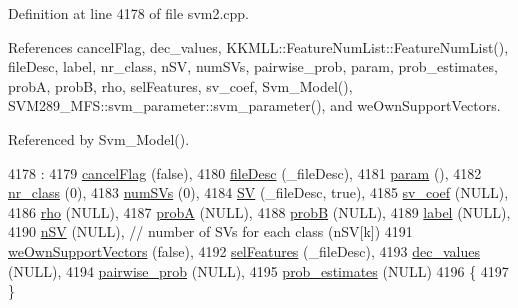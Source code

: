 Definition at line 4178 of file svm2.\+cpp.



References cancel\+Flag, dec\+\_\+values, K\+K\+M\+L\+L\+::\+Feature\+Num\+List\+::\+Feature\+Num\+List(), file\+Desc, label, nr\+\_\+class, n\+SV, num\+S\+Vs, pairwise\+\_\+prob, param, prob\+\_\+estimates, probA, probB, rho, sel\+Features, sv\+\_\+coef, Svm\+\_\+\+Model(), S\+V\+M289\+\_\+\+M\+F\+S\+::svm\+\_\+parameter\+::svm\+\_\+parameter(), and we\+Own\+Support\+Vectors.



Referenced by Svm\+\_\+\+Model().


\begin{DoxyCode}
4178                                                     :
4179    \hyperlink{struct_s_v_m289___m_f_s_1_1_svm___model_a01645368f6800875543d69ce8731d692}{cancelFlag}          (\textcolor{keyword}{false}),
4180    \hyperlink{struct_s_v_m289___m_f_s_1_1_svm___model_a60df40219f6193cae58891193aa1f44d}{fileDesc}            (\_fileDesc),
4181    \hyperlink{struct_s_v_m289___m_f_s_1_1_svm___model_af44a309facec24212604b219dc411582}{param}               (),
4182    \hyperlink{struct_s_v_m289___m_f_s_1_1_svm___model_a0cf11115996187369bc6152f30f6e64c}{nr\_class}            (0),
4183    \hyperlink{struct_s_v_m289___m_f_s_1_1_svm___model_a9d1cb317006096158440daf45c809f0c}{numSVs}              (0),
4184    \hyperlink{struct_s_v_m289___m_f_s_1_1_svm___model_ab2ebe759ca5aabb85fc6deea03706f0a}{SV}                  (\_fileDesc, \textcolor{keyword}{true}),
4185    \hyperlink{struct_s_v_m289___m_f_s_1_1_svm___model_afc428150716a2373a251c57f7e68bad3}{sv\_coef}             (NULL),
4186    \hyperlink{struct_s_v_m289___m_f_s_1_1_svm___model_ac6ee5562a25222e436bb29497cc98525}{rho}                 (NULL),
4187    \hyperlink{struct_s_v_m289___m_f_s_1_1_svm___model_ae32212566d46d6d9cafbddd37dcfbada}{probA}               (NULL),
4188    \hyperlink{struct_s_v_m289___m_f_s_1_1_svm___model_a4849dabb9dde1adde990980c6c7e1737}{probB}               (NULL),
4189    \hyperlink{struct_s_v_m289___m_f_s_1_1_svm___model_a2f46b2e4f808a25c5f4d15e65c988872}{label}               (NULL),
4190    \hyperlink{struct_s_v_m289___m_f_s_1_1_svm___model_a99c49e2824661c212c1599dcd636d2c0}{nSV}                 (NULL),     \textcolor{comment}{// number of SVs for each class (nSV[k])}
4191    \hyperlink{struct_s_v_m289___m_f_s_1_1_svm___model_a92c6022c1bf0e7094d7815692f3ec0e9}{weOwnSupportVectors} (\textcolor{keyword}{false}),
4192    \hyperlink{struct_s_v_m289___m_f_s_1_1_svm___model_a9a7868a9a65154d09d596dd97fb875a2}{selFeatures}         (\_fileDesc),
4193    \hyperlink{struct_s_v_m289___m_f_s_1_1_svm___model_a246da513040f5a6ab8c7cdd9dbf442f6}{dec\_values}          (NULL),
4194    \hyperlink{struct_s_v_m289___m_f_s_1_1_svm___model_a56bfa09257711ad80e18c3813a515fed}{pairwise\_prob}       (NULL),
4195    \hyperlink{struct_s_v_m289___m_f_s_1_1_svm___model_af9f2c576c765f5d622dd7bc55454883c}{prob\_estimates}      (NULL)
4196 \{
4197 \}
\end{DoxyCode}

